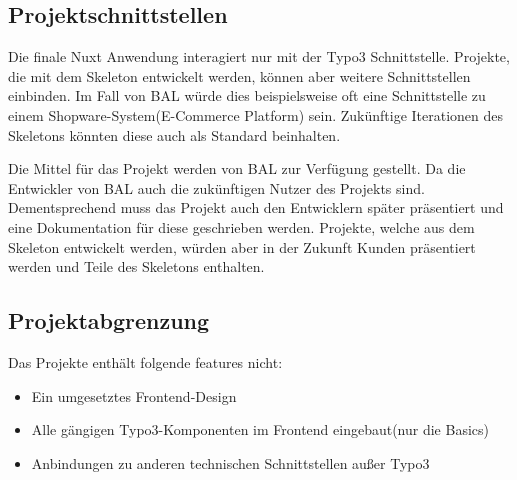 \subsection{Projektschnittstellen} 
\label{sec:Projektschnittstellen}

Die finale Nuxt Anwendung interagiert nur mit der Typo3 Schnittstelle. Projekte, die mit dem Skeleton entwickelt werden, können aber weitere Schnittstellen einbinden. Im Fall von \acs{BAL} würde dies beispielsweise oft eine Schnittstelle zu einem Shopware-System(E-Commerce Platform) sein. Zukünftige Iterationen des Skeletons könnten diese auch als Standard beinhalten.

Die Mittel für das Projekt werden von  \acs{BAL} zur Verfügung gestellt. Da die Entwickler von \acs{BAL} auch die zukünftigen Nutzer des Projekts sind. Dementsprechend muss das Projekt auch den Entwicklern später präsentiert und eine Dokumentation für diese geschrieben werden. Projekte, welche aus dem Skeleton entwickelt werden, würden aber in der Zukunft Kunden präsentiert werden und Teile des Skeletons enthalten.


\subsection{Projektabgrenzung} 
\label{sec:Projektabgrenzung}

Das Projekte enthält folgende features nicht:

\begin{itemize}
	\item Ein umgesetztes Frontend-Design
	\item Alle gängigen Typo3-Komponenten im Frontend eingebaut(nur die Basics)
	\item Anbindungen zu anderen technischen Schnittstellen außer Typo3
\end{itemize}
